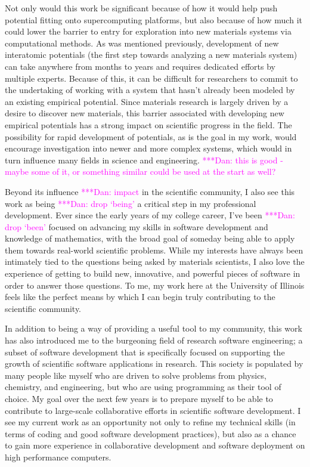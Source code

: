 \documentclass{article}
\newcommand{\katznote}[1]{ {\textcolor{magenta}    { ***Dan:      #1 }}}
\begin{document}
Not only would this work be significant because of how it would help push potential fitting onto supercomputing platforms, but also because of how much it could lower the barrier to entry for exploration into new materials systems via computational methods. As was mentioned previously, development of new interatomic potentials (the first step towards analyzing a new materials system) can take anywhere from months to years and requires dedicated efforts by multiple experts. Because of this, it can be difficult for researchers to commit to the undertaking of working with a system that hasn't already been modeled by an existing empirical potential. Since materials research is largely driven by a desire to discover new materials, this barrier associated with developing new empirical potentials has a strong impact on scientific progress in the field. The possibility for rapid development of potentials, as is the goal in my work, would encourage investigation into newer and more complex systems, which would in turn influence many fields in science and engineering. \katznote{this is good - maybe some of it, or something similar could be used at the start as well?}

\bigskip

Beyond its influence \katznote{impact} in the scientific community, I also see this work as being \katznote{drop `being'} a critical step in my professional development. Ever since the early years of my college career, I've been \katznote{drop `been'} focused on advancing my skills in software development and knowledge of mathematics, with the broad goal of someday being able to apply them towards real-world scientific problems. While my interests have always been intimately tied to the questions being asked by materials scientists, I also love the experience of getting to build new, innovative, and powerful pieces of software in order to answer those questions. To me, my work here at the University of Illinois feels like the perfect means by which I can begin truly contributing to the scientific community.

In addition to being a way of providing a useful tool to my community, this work has also introduced me to the burgeoning field of research software engineering; a subset of software development that is specifically focused on supporting the growth of scientific software applications in research. This society is populated by many people like myself who are driven to solve problems from physics, chemistry, and engineering, but who are using programming as their tool of choice. My goal over the next few years is to prepare myself to be able to contribute to large-scale collaborative efforts in scientific software development. I see my current work as an opportunity not only to refine my technical skills (in terms of coding and good software development practices), but also as a chance to gain more experience in collaborative development and software deployment on high performance computers.
\end{document}
